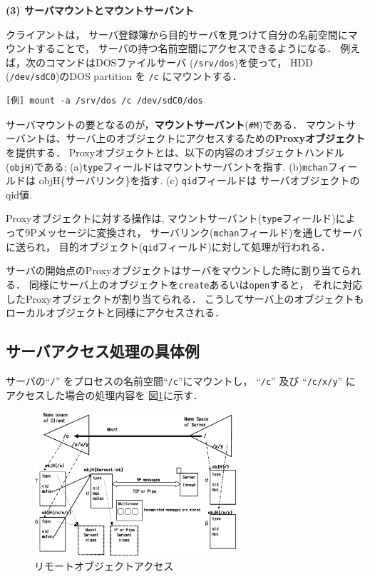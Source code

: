 \documentclass{ieicej}
\begin{document}
{\bf\flushleft (3) サーバマウントとマウントサーバント}

  クライアントは，
  サーバ登録簿から目的サーバを見つけて自分の名前空間にマウントすることで，
  サーバの持つ名前空間にアクセスできるようになる．
  例えば，次のコマンドはDOSファイルサーバ ({\tt /srv/dos})を使って，
  HDD ({\tt /dev/sdC0})のDOS partition を
  {\tt /c} にマウントする．

\begin{verbatim}
[例] mount -a /srv/dos /c /dev/sdC0/dos 
\end{verbatim}

   サーバマウントの要となるのが，{\bf マウントサーバント}(\verb|#M|)である．
   マウントサーバントは、サーバ上のオブジェクトにアクセスするための{\bf Proxyオブジェクト}
   を提供する．
   Proxyオブジェクトとは、以下の内容のオブジェクトハンドル({\tt objH})である; 
   (a){\tt type}フィールドはマウントサーバントを指す. 
   (b){\tt mchan}フィールドは objH\{サーバリンク\}を指す. 
   (c) {\tt qid}フィールドは サーバオブジェクトのqid値. 

   Proxyオブジェクトに対する操作は,
   マウントサーバント({\tt type}フィールド)によって9Pメッセージに変換され，
   サーバリンク({\tt mchan}フィールド)を通してサーバに送られ，
   目的オブジェクト({\tt qid}フィールド)に対して処理が行われる．

   サーバの開始点のProxyオブジェクトはサーバをマウントした時に割り当てられる． 
   同様にサーバ上のオブジェクトを{\tt create}あるいは{\tt open}すると，
   それに対応したProxyオブジェクトが割り当てられる．
   こうしてサーバ上のオブジェクトもローカルオブジェクトと同様にアクセスされる．

\subsection{サーバアクセス処理の具体例}

 サーバの``{\tt /}'' をプロセスの名前空間``{\tt /c}''にマウントし，
``{\tt /c}'' 及び ``{\tt /c/x/y}''  にアクセスした場合の処理内容を
図\ref{fig:RemoteAccess}に示す．

\begin{figure}[tb]
  \begin{center}
   \includegraphics[width=75mm]{../fig/RemoteAccess2.eps}
    \caption{リモートオブジェクトアクセス}
    \label{fig:RemoteAccess}
  \end{center}
\end{figure}
\end{document}
